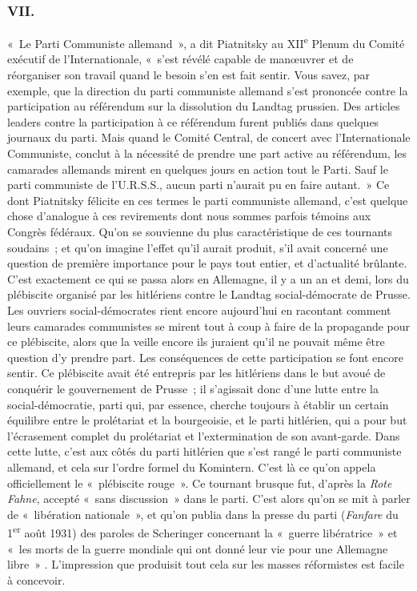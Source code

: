 \documentclass[french,twoside]{book} %
\begin{document}
\subsubsection[VII.]{VII.}
\noindent « Le Parti Communiste allemand », a dit Piatnitsky au XII\textsuperscript{e} Plenum du Comité exécutif de l'Internationale, « s'est révélé capable de manœuvrer et de réorganiser son travail quand le besoin s'en est fait sentir. Vous savez, par exemple, que la direction du parti communiste allemand s'est prononcée contre la participation au référendum sur la dissolution du Landtag prussien. Des articles leaders contre la participation à ce référendum furent publiés dans quelques journaux du parti. Mais quand le Comité Central, de concert avec l'Internationale Communiste, conclut à la nécessité de prendre une part active au référendum, les camarades allemands mirent en quelques jours en action tout le Parti. Sauf le parti communiste de l'U.R.S.S., aucun parti n'aurait pu en faire autant. » Ce dont Piatnitsky félicite en ces termes le parti communiste allemand, c'est quelque chose d'analogue à ces revirements dont nous sommes parfois témoins aux Congrès fédéraux. Qu'on se souvienne du plus caractéris­tique de ces tournants soudains ; et qu'on imagine l'effet qu'il aurait produit, s'il avait concerné une question de première importance pour le pays tout entier, et d'actualité brûlante. C'est exactement ce qui se passa alors en Allemagne, il y a un an et demi, lors du plébiscite organisé par les hitlériens contre le Landtag social-démocrate de Prusse. Les ouvriers social-démocrates rient encore aujourd'hui en racontant comment leurs camarades communistes se mirent tout à coup à faire de la propagande pour ce plébiscite, alors que la veille encore ils juraient qu'il ne pouvait même être question d'y prendre part. Les conséquences de cette participation se font encore sentir. Ce plébiscite avait été entrepris par les hitlériens dans le but avoué de conquérir le gouver­nement de Prusse ; il s'agissait donc d'une lutte entre la social-démocratie, parti qui, par essence, cherche toujours à établir un certain équilibre entre le prolétariat et la bourgeoisie, et le parti hitlérien, qui a pour but l'écrasement complet du prolétariat et l'extermination de son avant-garde. Dans cette lutte, c'est aux côtés du parti hitlérien que s'est rangé le parti communiste allemand, et cela sur l'ordre formel du Komintern. C'est là ce qu'on appela officiellement le « plébiscite rouge ». Ce tournant brusque fut, d'après la {\itshape Rote Fahne}, accepté « sans discussion » dans le parti. C'est alors qu'on se mit à parler de « libé­ration nationale », et qu'on publia dans la presse du parti ({\itshape Fanfare} du 1\textsuperscript{er} août 1931) des paroles de Scheringer concernant la « guerre libératrice » et « les morts de la guerre mondiale qui ont donné leur vie pour une Allemagne libre » . L'impression que produisit tout cela sur les masses réformistes est facile à concevoir.\par
\end{document}
